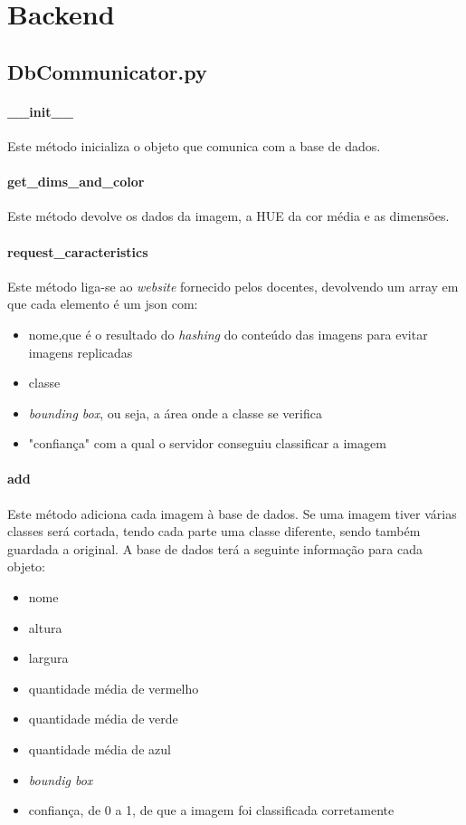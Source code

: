 \documentclass{report}
\begin{document}
\section{Backend}
\subsection{DbCommunicator.py}
\paragraph{\_\_init\_\_}
Este método inicializa o objeto que comunica com a base de dados.

\paragraph{get\_dims\_and\_color}
Este método devolve os dados da imagem, a HUE da cor média e as dimensões. 

\paragraph{request\_caracteristics}
Este método liga-se ao \textit{website} fornecido pelos docentes, devolvendo um array em que cada elemento é um \ac{json} com:
\begin{itemize}
\item nome,que é o resultado do \textit{hashing} do conteúdo das imagens para evitar imagens replicadas
\item classe
\item \textit{bounding box}, ou seja, a área onde a classe se verifica
\item "confiança" com a qual o servidor conseguiu classificar a imagem
\end{itemize}

\paragraph{add}
Este método adiciona cada imagem à base de dados. Se uma imagem tiver várias classes será  cortada, tendo cada parte  uma classe diferente, sendo também guardada a original. A base de dados terá a seguinte informação para cada objeto:
\begin{itemize}
\item nome
\item altura
\item largura
\item quantidade média de vermelho
\item quantidade média de verde
\item quantidade média de azul
\item \textit{boundig box}
\item confiança, de 0 a 1, de que a imagem foi classificada corretamente
\end{itemize}
\end{document}
